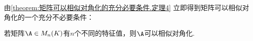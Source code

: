 由\cref{theorem:矩阵可以相似对角化的充分必要条件.定理4} 立即得到矩阵可以相似对角化的一个充分不必要条件：
\begin{corollary}\label{theorem:矩阵可以相似对角化的充分条件.定理1}
若矩阵\(\A \in M_n(K)\)有\(n\)个不同的特征值，则\(\A\)可以相似对角化.
\end{corollary}

